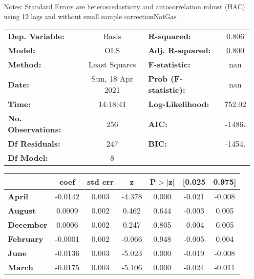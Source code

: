 Notes: \newline
 [1] Standard Errors are heteroscedasticity and autocorrelation robust (HAC) using 12 lags and without small sample correctionNatGas\begin{center}
\begin{tabular}{lclc}
\toprule
\textbf{Dep. Variable:}    &      Basis       & \textbf{  R-squared:         } &     0.806   \\
\textbf{Model:}            &       OLS        & \textbf{  Adj. R-squared:    } &     0.800   \\
\textbf{Method:}           &  Least Squares   & \textbf{  F-statistic:       } &       nan   \\
\textbf{Date:}             & Sun, 18 Apr 2021 & \textbf{  Prob (F-statistic):} &      nan    \\
\textbf{Time:}             &     14:18:41     & \textbf{  Log-Likelihood:    } &    752.02   \\
\textbf{No. Observations:} &         256      & \textbf{  AIC:               } &    -1486.   \\
\textbf{Df Residuals:}     &         247      & \textbf{  BIC:               } &    -1454.   \\
\textbf{Df Model:}         &           8      & \textbf{                     } &             \\
\bottomrule
\end{tabular}
\begin{tabular}{lcccccc}
                  & \textbf{coef} & \textbf{std err} & \textbf{z} & \textbf{P$> |$z$|$} & \textbf{[0.025} & \textbf{0.975]}  \\
\midrule
\textbf{April}    &      -0.0142  &        0.003     &    -4.378  &         0.000        &       -0.021    &       -0.008     \\
\textbf{August}   &       0.0009  &        0.002     &     0.462  &         0.644        &       -0.003    &        0.005     \\
\textbf{December} &       0.0006  &        0.002     &     0.247  &         0.805        &       -0.004    &        0.005     \\
\textbf{February} &      -0.0001  &        0.002     &    -0.066  &         0.948        &       -0.005    &        0.004     \\
\textbf{June}     &      -0.0136  &        0.003     &    -5.023  &         0.000        &       -0.019    &       -0.008     \\
\textbf{March}    &      -0.0175  &        0.003     &    -5.106  &         0.000        &       -0.024    &       -0.011     \\

\end{tabular}
\end{center}
